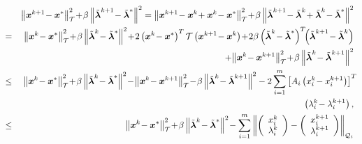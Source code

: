 \documentclass{mcom-l}
\theoremstyle{definition}
\theoremstyle{remark}
\numberwithin{equation}{section}
\begin{document}
{\footnotesize\begin{eqnarray}
&&\left\|{{\mbox{\boldmath $x$}}}^{k+1} \!- {{\mbox{\boldmath $x$}}}^*\right\|_{\mathcal{T}}^2 \!+\! \beta \left\| \tilde{{\mbox{\boldmath $\lambda$}}}^{k+1} \!- \tilde{{\mbox{\boldmath $\lambda$}}}^* \right\|^2 = \left\|{{\mbox{\boldmath $x$}}}^{k+1} \!- {{\mbox{\boldmath $x$}}}^k \!+ {{\mbox{\boldmath $x$}}}^k \!- {{\mbox{\boldmath $x$}}}^*\right\|_{\mathcal{T}}^2\! +\! \beta \left\| \tilde{{\mbox{\boldmath $\lambda$}}}^{k+1} \!- \tilde{{\mbox{\boldmath $\lambda$}}}^k \!+ \tilde{{\mbox{\boldmath $\lambda$}}}^k \!- \tilde{{\mbox{\boldmath $\lambda$}}}^* \right\|^2\nonumber\\
\!\!&=&\!\! \left\|{{\mbox{\boldmath $x$}}}^k \!- {{\mbox{\boldmath $x$}}}^*\right\|_{\mathcal{T}}^2 \!+\! \beta \left\| \tilde{{\mbox{\boldmath $\lambda$}}}^k \!- \tilde{{\mbox{\boldmath $\lambda$}}}^* \right\|^2 \!+\! 2 \left( {{\mbox{\boldmath $x$}}}^k \!- {{\mbox{\boldmath $x$}}}^* \right)^T {\mathcal{T}} \left( {{\mbox{\boldmath $x$}}}^{k+1} \!- {{\mbox{\boldmath $x$}}}^k \right)\! + \!2 \beta \left( \tilde{{\mbox{\boldmath $\lambda$}}}^k \!- \tilde{{\mbox{\boldmath $\lambda$}}}^* \right)^T\!\! \left( \tilde{{\mbox{\boldmath $\lambda$}}}^{k+1} \!- \tilde{{\mbox{\boldmath $\lambda$}}}^k \right)\nonumber\\
&&\!+\!\left\|{{\mbox{\boldmath $x$}}}^k \!- {{\mbox{\boldmath $x$}}}^{k+1}\right\|_{\mathcal{T}}^2 \!+\! \beta \left\| \tilde{{\mbox{\boldmath $\lambda$}}}^k \!- \tilde{{\mbox{\boldmath $\lambda$}}}^{k+1} \right\|^2 \nonumber\\
\!\!&\le&\!\! \left\|{{\mbox{\boldmath $x$}}}^k \!- {{\mbox{\boldmath $x$}}}^*\right\|_{\mathcal{T}}^2 \!+\! \beta \left\| \tilde{{\mbox{\boldmath $\lambda$}}}^k \!- \tilde{{\mbox{\boldmath $\lambda$}}}^* \right\|^2 \!-\!\left\|{{\mbox{\boldmath $x$}}}^k \!- {{\mbox{\boldmath $x$}}}^{k+1}\right\|_{\mathcal{T}}^2 \!-\! \beta \left\| \tilde{{\mbox{\boldmath $\lambda$}}}^k \!- \tilde{{\mbox{\boldmath $\lambda$}}}^{k+1} \right\|^2 - 2\sum_{i=1}^m \left[ A_i \left( x_i^k \!- x_i^{k+1} \right) \right]^T \!\!\nonumber\\
&&  \left( \lambda_i^k \!- \lambda_i^{k+1} \right), \nonumber\\
\!\!&\le&\!\! \left\|{{\mbox{\boldmath $x$}}}^k \!- {{\mbox{\boldmath $x$}}}^*\right\|_{\mathcal{T}}^2 \!+\! \beta \left\| \tilde{{\mbox{\boldmath $\lambda$}}}^k \!- \tilde{{\mbox{\boldmath $\lambda$}}}^* \right\|^2 \!-\sum_{i=1}^m \left\| \left( \begin{array}{c} x_i^k\\ \lambda_i^k \end{array} \right) - \left( \begin{array}{c} x_i^{k+1}\\ \lambda_i^{k+1} \end{array} \right) \right\|_{{\mathcal{Q}}_i} \nonumber
\end{eqnarray}}
\end{document}
